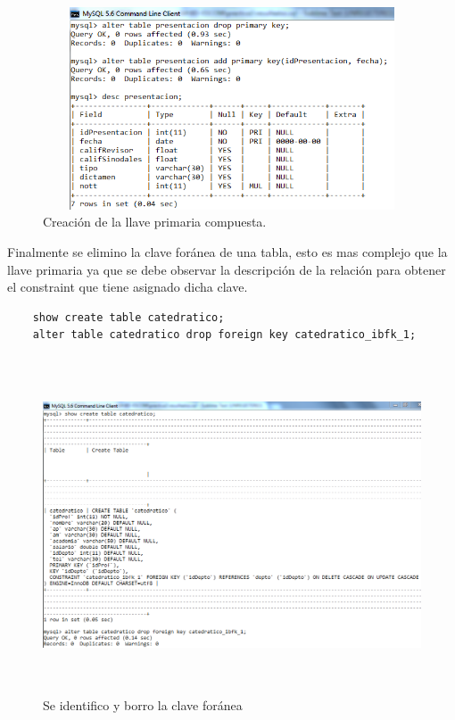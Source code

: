 \documentclass[12pt, titlepage]{article}
\begin{document}
    \begin{figure}[H]
        \begin{center}
            \includegraphics[width=12cm, height=6cm]{img/primaria.png}
            \caption{Creación de la llave primaria compuesta.}
            \label{fig:primaria}
        \end{center}
    \end{figure}
    Finalmente se elimino la clave foránea de una tabla, esto es mas complejo que la llave primaria ya que se debe observar la descripción de la relación para obtener el constraint que tiene asignado dicha clave.
    \begin{lstlisting}
    show create table catedratico;
    alter table catedratico drop foreign key catedratico_ibfk_1;
    \end{lstlisting}
    \begin{figure}[H]
        \begin{center}
            \includegraphics[width=16cm, height=10cm]{img/constraint.png}
            \caption{Se identifico y borro la clave foránea}
            \label{fig:constraint}
        \end{center}
    \end{figure}
\end{document}
